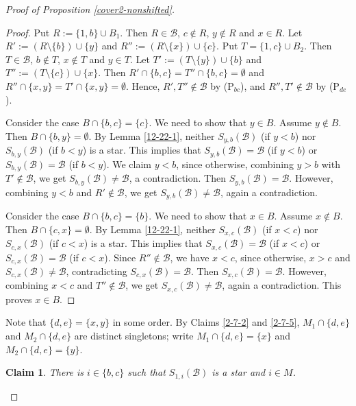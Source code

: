 \documentclass[a4paper,11pt]{article}
\newtheorem{claim}[theorem]{Claim}
\newcommand{\m}{\mathcal}
\begin{document}
\begin{proof}[Proof of Proposition \ref{cover2-nonshifted}]
\begin{proof}
Put $R:=\{1,b\}\cup B_1$. 
Then $R\in \m B$, $c\not\in R$, $y\not\in R$ and $x\in R$. 
Let $R':=(R\setminus \{b\})\cup \{y\}$ and  $R'':=(R\setminus \{x\})\cup \{c\}$.
Put $T=\{1,c\}\cup B_2$.
Then $T \in \m B$, $b\not\in T$, $x\not\in T$ and $y\in T$. 
Let $T':=(T\setminus \{y\})\cup \{b\}$ and $T'':=(T\setminus \{c\})\cup \{x\}$. 
Then $R'\cap \{b,c\}=T''\cap \{b,c\}=\emptyset$ and $R''\cap \{x,y\}=T'\cap \{x,y\}=\emptyset$. 
Hence, $R', T''\not\in \m B$ by (P$_{bc}$), and $R'', T' \not\in \m B$ by (P$_{de}$). 

Consider the case $B\cap \{b,c\}=\{c\}$. We need to show that $y\in B$. Assume $y\not\in B$. Then $B\cap \{b,y\}=\emptyset$.  
By Lemma \ref{12-22-1}, neither $S_{y,b}(\m B)$ (if $y<b$) nor $S_{b, y}(\m B)$ (if $b<y$) is a star. This implies that  $S_{y,b}(\m B)=\m B$ (if $y<b$) or $S_{b, y}(\m B)=\m B$ (if $b<y$). 
We claim $y<b$, since otherwise, combining $y>b$ with $T'\not\in \m B$, we get $S_{b, y}(\m B)\ne\m B$, a contradiction.
Then $S_{y,b}(\m B)=\m B$. However, combining $y<b$ and $R'\not\in \m B$, we get $S_{y,b}(\m B)\ne \m B$, again a contradiction. 


Consider the case $B\cap \{b,c\}=\{b\}$. We need to show that $x\in B$. Assume $x\not\in B$. 
Then $B\cap \{c, x\}=\emptyset$.
By Lemma \ref{12-22-1}, neither $S_{x,c}(\m B)$ (if $x<c$) nor $S_{c, x}(\m B)$ (if $c<x$) is a star. This implies that  $S_{x,c}(\m B)=\m B$ (if $x<c$) or $S_{c,x}(\m B)=\m B$ (if $c<x$).  
Since $R''\not\in \m B$, we have $x<c$, since otherwise, $x>c$ and $S_{c,x}(\m B)\ne \m  B$, contradicting $S_{c, x}(\m B)=\m B$. Then $S_{x,c}(\m B)=\m B$. However, combining $x<c$ and $T''\not\in \m B$, we get $S_{x,c}(\m B)\ne\m B$, again a contradiction.
This proves $x\in B$.
\end{proof}

Note that $\{d,e\}=\{x,y\}$ in some order.
By Claims \ref{2-7-2} and \ref{2-7-5}, $M_1\cap \{d,e\}$ and $M_2\cap \{d,e\}$ are distinct singletons; write $M_1\cap \{d,e\}=\{x\}$ and $M_2\cap \{d,e\}=\{y\}$. 

\begin{claim}\label{bcstar}
There is $i\in \{b,c\}$ such that $S_{1,i}(\m B)$ is a star and $i\in M$.
\end{claim}


\end{proof}
\end{document}
